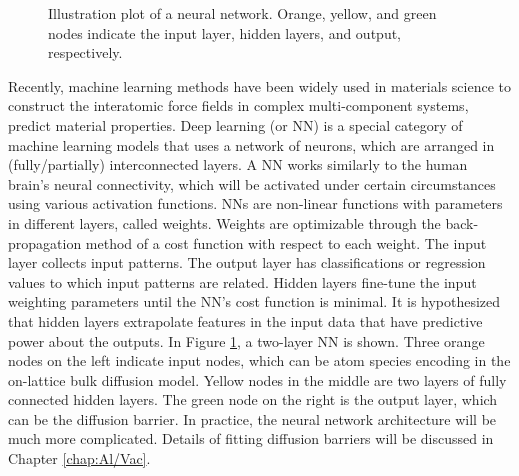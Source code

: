 \begingroup
\begin{figure}[!ht]
  \centering
  \caption[Illustration plot of a neural network.]{Illustration plot of a neural network. Orange, yellow, and green nodes indicate the input layer, hidden layers, and output, respectively.}
  \label{Chap:Meth:NN:fig1}
\end{figure}
\endgroup
Recently, machine learning methods have been widely used in materials science to construct the interatomic force fields in complex multi-component systems\cite{artrith2016implementation}, predict material properties\cite{hu2019local,hu2020predicting}.
Deep learning (or \ac{NN}) is a special category of machine learning models that uses a network of neurons, which are arranged in (fully/partially) interconnected layers. A \ac{NN} works similarly to the human brain’s neural connectivity, which will be activated under certain circumstances using various activation functions. \ac{NN}s are non-linear functions with parameters in different layers, called weights. Weights are optimizable through the back-propagation method of a cost function with respect to each weight. The input layer collects input patterns. The output layer has classifications or regression values to which input patterns are related. Hidden layers fine-tune the input weighting parameters until the \ac{NN}’s cost function is minimal. It is hypothesized that hidden layers extrapolate features in the input data that have predictive power about the outputs. In Figure \ref{Chap:Meth:NN:fig1}, a two-layer \ac{NN} is shown. Three orange nodes on the left indicate input nodes, which can be atom species encoding in the on-lattice bulk diffusion model. Yellow nodes in the middle are two layers of fully connected hidden layers. The green node on the right is the output layer, which can be the diffusion barrier. In practice, the neural network architecture will be much more complicated. Details of fitting diffusion barriers will be discussed in Chapter \ref{chap:Al/Vac}.